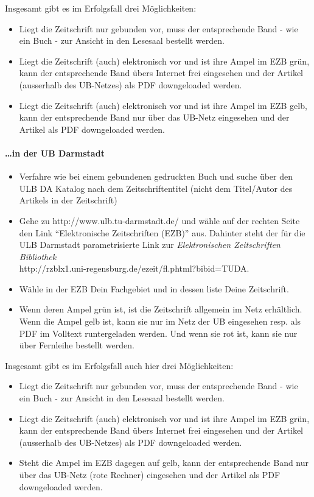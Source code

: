 \documentclass[DIV=calc,BCOR=5mm,11pt,headings=small,oneside,abstract=false, toc=bib]{scrartcl}
\begin{document}
Insgesamt gibt es im Erfolgsfall drei Möglichkeiten:
\begin{itemize}
  \item Liegt die Zeitschrift nur gebunden vor, muss der entsprechende Band -
  wie ein Buch - zur Ansicht in den Lesesaal bestellt werden.
  \item Liegt die Zeitschrift (auch) elektronisch vor und ist ihre Ampel im
  EZB grün, kann der entsprechende Band übers Internet frei eingesehen und der
  Artikel (ausserhalb des UB-Netzes) als PDF downgeloaded werden.
  \item Liegt die Zeitschrift (auch) elektronisch vor und ist ihre Ampel im
  EZB gelb, kann der entsprechende Band nur über das UB-Netz eingesehen und
  der Artikel als PDF downgeloaded werden.
\end{itemize}  

\paragraph{\ldots in der UB Darmstadt}

\begin{itemize}
  \item Verfahre wie bei einem gebundenen gedruckten Buch und suche über den ULB
  DA Katalog nach dem Zeitschriftentitel (nicht dem Titel/Autor des Artikels
  in der Zeitschrift)
  \item  Gehe zu {\ttfamily http://www.ulb.tu-darmstadt.de/} und wähle auf der
  rechten Seite den Link \enquote{Elektronische Zeitschriften (EZB)} aus.
  Dahinter steht der für die ULB Darmstadt parametrisierte Link zur
  \emph{Elektronischen Zeitschriften Bibliothek} \\{\ttfamily
  http://rzblx1.uni-regensburg.de/ezeit/fl.phtml?bibid=TUDA}.
  \item Wähle in der EZB Dein Fachgebiet und in dessen liste Deine Zeitschrift.
  \item Wenn deren Ampel grün ist, ist die Zeitschrift allgemein im Netz
  erhältlich. Wenn die Ampel gelb ist, kann sie nur im Netz der UB eingesehen
  resp. als PDF im Volltext runtergeladen werden. Und wenn sie rot ist, kann sie
  nur über Fernleihe bestellt werden.
\end{itemize}

Insgesamt gibt es im Erfolgsfall auch hier drei Möglichkeiten:
\begin{itemize}
  \item Liegt die Zeitschrift nur gebunden vor, muss der entsprechende Band -
  wie ein Buch - zur Ansicht in den Lesesaal bestellt werden.
  \item Liegt die Zeitschrift (auch) elektronisch vor und ist ihre Ampel im
  EZB grün, kann der entsprechende Band übers Internet frei eingesehen und der
  Artikel (ausserhalb des UB-Netzes) als PDF downgeloaded werden.
  \item Steht die Ampel im EZB dagegen auf gelb, kann der entsprechende Band nur
  über das UB-Netz (rote Rechner) eingesehen und der Artikel als PDF
  downgeloaded werden.
\end{itemize}  
\end{document}

